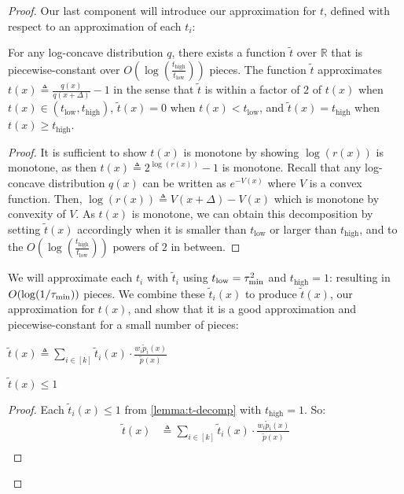 \begin{proof}
Our last component will introduce our approximation for $t$, defined with respect to an approximation of each $t_i$:
  \begin{lemma}\label{lemma:t-decomp}
        For any log-concave distribution $q$, there exists a function $\tilde{t}$ over $\mathbb{R}$ that is piecewise-constant over $O(\log(\frac{t_{\textrm{high}}}{t_{\textrm{low}}}))$ pieces.
        The function $\tilde{t}$ approximates $t(x) \triangleq \frac{q(x)}{q(x+\Delta)} - 1$ in the sense that $\tilde{t}$ is within a factor of $2$ of $t(x)$ when $t(x)\in(t_\textrm{low},t_\textrm{high})$, $\tilde{t}(x)=0$ when $t(x)< t_\textrm{low}$, and $\tilde{t}(x)=t_\textrm{high}$ when $t(x)\ge t_\textrm{high}$.
    \end{lemma}
    \begin{proof}
        It is sufficient to show $t(x)$ is monotone by showing $\log(r(x))$ is monotone, as then $t(x) \triangleq 2^{\log(r(x))} - 1$ is monotone. 
        Recall that any log-concave distribution $q(x)$ can be written as $e^{-V(x)}$ where $V$ is a convex function.
        Then, $\log(r(x)) \triangleq V(x+\Delta)-V(x)$ which is monotone by convexity of $V$. 
As $t(x)$ is monotone, we can obtain this decomposition by setting $\tilde{t}(x)$ accordingly when it is smaller than $t_{\textrm{low}}$ or larger than $t_{\textrm{high}}$, and to the $O(\log(\frac{t_{\textrm{high}}}{t_{\textrm{low}}}))$ powers of $2$ in between.
    \end{proof}
    We will approximate each $t_i$ with $\tilde{t}_i$ using $t_{\textrm{low}}=\tau_{\textrm{min}}^2$ and $t_{\textrm{high}}=1$: resulting in $O(\log(1/\tau_{\textrm{min}}))$ pieces. 
    We combine these $\tilde{t}_i(x)$ to produce $\tilde{t}(x)$, our approximation for $t(x)$, and show that it is a good approximation and piecewise-constant for a small number of pieces:
\begin{definition}
    $\tilde{t}(x) \triangleq \sum_{i \in [k]} \tilde{t}_i(x) \cdot \frac{w_i \tilde{p}_i(x)}{\tilde{p}(x)}$
\end{definition}
\begin{remark} \label{rem:t-bound}
    $\tilde{t}(x) \le 1$
\end{remark}
\begin{proof}
    Each $\tilde{t}_i(x) \le 1$ from \cref{lemma:t-decomp} with $t_{\textrm{high}}=1$.
    So:
    \begin{align*}
        \tilde{t}(x) & \triangleq \sum_{i \in [k]} \tilde{t}_i(x) \cdot \frac{w_i \tilde{p}_i(x)}{\tilde{p}(x)}\\

\end{align*}
\end{proof}
\end{proof}

